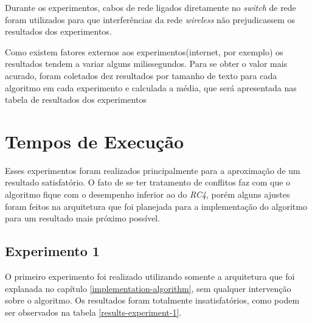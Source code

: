 Durante os experimentos, cabos de rede ligados diretamente no \textit{switch} de rede foram utilizados para que interferências da rede \textit{wireless} não prejudicassem os resultados dos experimentos. 

Como existem fatores externos aos experimentos(internet, por exemplo) os resultados tendem a variar alguns milissegundos. Para se obter o valor mais acurado, foram coletados dez resultados por tamanho de texto para cada algoritmo em cada experimento e calculada a média, que será apresentada nas tabela de resultados dos experimentos

\section{Tempos de Execução}

Esses experimentos foram realizados principalmente para a aproximação de um resultado satisfatório. O fato de se ter tratamento de conflitos faz com que o algoritmo fique com o desempenho inferior ao do \textit{RC4}, porém alguns ajustes foram feitos na arquitetura que foi planejada para a implementação do algoritmo para um resultado mais próximo possível.

\subsection{Experimento 1}

O primeiro experimento foi realizado utilizando somente a arquitetura que foi explanada no capítulo \ref{implementation-algorithm}, sem qualquer intervenção sobre o algoritmo. Os resultados foram totalmente insatisfatórios, como podem ser observados na tabela \ref{results-experiment-1}.

